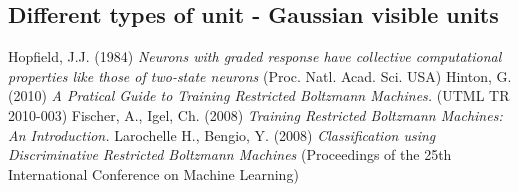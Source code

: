 \documentclass[a4paper]{scrartcl}
\begin{document}
\subsection{Different types of unit - Gaussian visible units}
\begin{thebibliography}{9}
    Hopfield, J.J. (1984) \emph{Neurons with graded response have collective computational properties like those of two-state neurons} (Proc. Natl. Acad. Sci. USA)
    Hinton, G. (2010) \emph{A Pratical Guide to Training Restricted Boltzmann Machines.} (UTML TR 2010-003)
    Fischer, A., Igel, Ch. (2008) \emph{Training Restricted Boltzmann Machines: An Introduction.} 
    Larochelle H., Bengio, Y. (2008) \emph {Classification using Discriminative Restricted Boltzmann Machines} (Proceedings of the 25th International Conference on Machine Learning)
\end{thebibliography}
\end{document}
